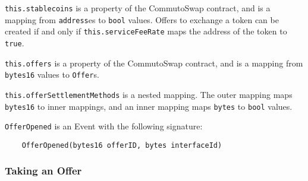 \documentclass[11pt]{article}
\begin{document}
    \verb|this.stablecoins| is a property of the CommutoSwap contract, and is a mapping from
    \verb|address|es to \verb|bool| values.
    Offers to exchange a token can be created if and only if \verb|this.serviceFeeRate| maps the
    address of the token to \verb|true|.

    \verb|this.offers| is a property of the CommutoSwap contract, and is a mapping from
    \verb|bytes16| values to \verb|Offer|s.

    \verb|this.offerSettlementMethods| is a nested mapping.
    The outer mapping maps \verb|bytes16| to inner mappings, and an inner mapping maps \verb|bytes|
    to \verb|bool| values.

    \verb|OfferOpened| is an Event with the following signature:
    \begin{verbatim}
    OfferOpened(bytes16 offerID, bytes interfaceId)
    \end{verbatim}

    \subsubsection*{Taking an Offer}
\end{document}
